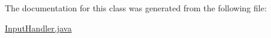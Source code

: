 \-The documentation for this class was generated from the following file\-:\begin{DoxyCompactItemize}
\item 
\hyperlink{InputHandler_8java}{\-Input\-Handler.\-java}\end{DoxyCompactItemize}
